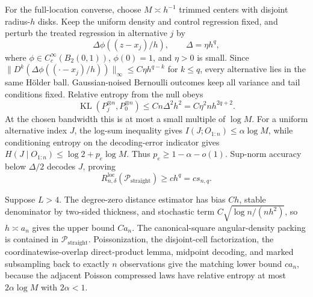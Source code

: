 For the full-location converse, choose \(M\asymp h^{-1}\) trimmed centers with disjoint radius-\(h\) disks.  Keep the uniform density and control regression fixed, and perturb the treated regression in alternative \(j\) by
\[
\Delta\phi((z-x_j)/h),\qquad \Delta=\eta h^q,
\]
where \(\phi\in C_c^\infty(B_2(0,1))\), \(\phi(0)=1\), and \(\eta>0\) is small.  Since \(\lVert D^k(\Delta\phi((\cdot-x_j)/h))\rVert_\infty\leq C\eta h^{q-k}\) for \(k\leq q\), every alternative lies in the same H\"older ball.  Gaussian-noised Bernoulli outcomes keep all variance and tail conditions fixed.  Relative entropy from the null obeys
\[
\operatorname{KL}(P_j^{\otimes n},P_0^{\otimes n})
\leq Cn\Delta^2h^2=C\eta^2nh^{2q+2}.
\]
At the chosen bandwidth this is at most a small multiple of \(\log M\).  For a uniform alternative index \(J\), the log-sum inequality gives \(I(J;O_{1:n})\leq\alpha\log M\), while conditioning entropy on the decoding-error indicator gives \(H(J\mid O_{1:n})\leq\log2+p_e\log M\).  Thus \(p_e\geq1-\alpha-o(1)\).  Sup-norm accuracy below \(\Delta/2\) decodes \(J\), proving
\[
R_{n,\delta}^{\mathrm{loc}}(\mathcal P_{\mathrm{straight}})\geq c h^q=cs_{n,q}.
\]

Suppose \(L>4\).  The degree-zero distance estimator has bias \(Ch\), stable denominator by two-sided thickness, and stochastic term \(C\sqrt{\log n/(nh^2)}\), so \(h\asymp a_n\) gives the upper bound \(Ca_n\).  The canonical-square angular-density packing is contained in \(\mathcal P_{\mathrm{straight}}\).  Poissonization, the disjoint-cell factorization, the coordinatewise-overlap direct-product lemma, midpoint decoding, and marked subsampling back to exactly \(n\) observations give the matching lower bound \(ca_n\), because the adjacent Poisson compressed laws have relative entropy at most \(2\alpha\log M\) with \(2\alpha<1\).

